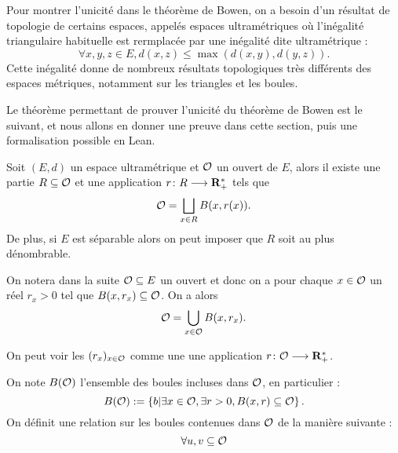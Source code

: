 \documentclass[../../rapport.tex]{subfiles}
\begin{document}
  Pour montrer l'unicité dans le théorème de Bowen, on a besoin d'un résultat de topologie de certains espaces,
  appelés espaces ultramétriques où l'inégalité triangulaire habituelle est rermplacée par une inégalité dite ultramétrique :
  $$\forall x, y, z \in E, d(x, z) \le \max{(d(x, y), d(y, z))}.$$
  Cette inégalité donne de nombreux résultats topologiques très différents des espaces métriques,
  notamment sur les triangles et les boules.

  Le théorème permettant de prouver l'unicité du théorème de Bowen est le suivant,
  et nous allons en donner une preuve dans cette section,
  puis une formalisation possible en Lean.

  \begin{theorem}
    Soit $(E, d)$ un espace ultramétrique et $\mathcal{O}$ un ouvert de $E$,
    alors il existe une partie $R \subseteq \mathcal{O}$ et une application $r \colon R \longrightarrow \mathbf R^*_+$ tels que
    $$\mathcal{O} = \bigsqcup_{x \in R}{B(x, r(x))}.$$
    De plus, si $E$ est séparable alors on peut imposer que $R$ soit au plus dénombrable.
  \end{theorem}

  On notera dans la suite $\mathcal{O} \subseteq E$ un ouvert et donc on a pour chaque $x \in \mathcal{O}$ un réel $r_x > 0$ tel que
  $B(x, r_x) \subseteq \mathcal{O}$. On a alors
  $$\mathcal{O} = \bigcup_{x\in\mathcal{O}}{B(x, r_x)}.$$

  \begin{remark}
    On peut voir les $(r_x)_{x\in\mathcal{O}}$ comme une une application $r \colon \mathcal{O} \longrightarrow \mathbf R^*_+$.
  \end{remark}

  \begin{definition}
    On note $B(\mathcal{O})$ l'ensemble des boules incluses dans $\mathcal{O}$, en particulier :
    $$B(\mathcal{O}) := \left\{b | \exists x \in \mathcal{O}, \exists r > 0, B(x, r) \subseteq \mathcal{O} \right\}.$$
    On définit une relation sur les boules contenues dans $\mathcal{O}$ de la manière suivante :
    $$\forall u, v \subseteq \mathcal{O}$$ %
  \end{definition}
\end{document}
